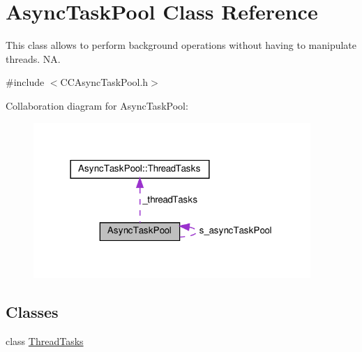 \hypertarget{classAsyncTaskPool}{}\section{Async\+Task\+Pool Class Reference}
\label{classAsyncTaskPool}


This class allows to perform background operations without having to manipulate threads.  NA.  




{\ttfamily \#include $<$C\+C\+Async\+Task\+Pool.\+h$>$}



Collaboration diagram for Async\+Task\+Pool\+:
\nopagebreak
\begin{figure}[H]
\begin{center}
\leavevmode
\includegraphics[width=298pt]{classAsyncTaskPool__coll__graph}
\end{center}
\end{figure}
\subsection*{Classes}
\begin{DoxyCompactItemize}
\item 
class \hyperlink{classAsyncTaskPool_1_1ThreadTasks}{Thread\+Tasks}
\end{DoxyCompactItemize}
